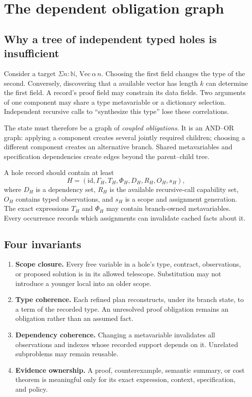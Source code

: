 \documentclass[11pt,letterpaper]{article}
\theoremstyle{definition}
\theoremstyle{remark}
\begin{document}
\section{The dependent obligation graph}
\label{sec:graph}

\subsection{Why a tree of independent typed holes is insufficient}

Consider a target $\Sigma n:\mathbb N,\,\mathrm{Vec}\,\alpha\,n$. Choosing the first field changes the type of the second. Conversely, discovering that a available vector has length $k$ can determine the first field. A record's proof field may constrain its data fields. Two arguments of one component may share a type metavariable or a dictionary selection. Independent recursive calls to ``synthesize this type'' lose these correlations.

The state must therefore be a graph of \emph{coupled obligations}. It is an AND--OR graph: applying a component creates several jointly required children; choosing a different component creates an alternative branch. Shared metavariables and specification dependencies create edges beyond the parent--child tree.

A hole record should contain at least
\[
 H=(\mathrm{id},\Gamma_H,T_H,\Phi_H,D_H,R_H,O_H,s_H),
\]
where $D_H$ is a dependency set, $R_H$ is the available recursive-call capability set, $O_H$ contains typed observations, and $s_H$ is a scope and assignment generation. The exact expressions $T_H$ and $\Phi_H$ may contain branch-owned metavariables. Every occurrence records which assignments can invalidate cached facts about it.

\subsection{Four invariants}

\begin{enumerate}
\item \textbf{Scope closure.} Every free variable in a hole's type, contract, observations, or proposed solution is in its allowed telescope. Substitution may not introduce a younger local into an older scope.
\item \textbf{Type coherence.} Each refined plan reconstructs, under its branch state, to a term of the recorded type. An unresolved proof obligation remains an obligation rather than an assumed fact.
\item \textbf{Dependency coherence.} Changing a metavariable invalidates all observations and indexes whose recorded support depends on it. Unrelated subproblems may remain reusable.
\item \textbf{Evidence ownership.} A proof, counterexample, semantic summary, or cost theorem is meaningful only for its exact expression, context, specification, and policy.
\end{enumerate}
\end{document}
